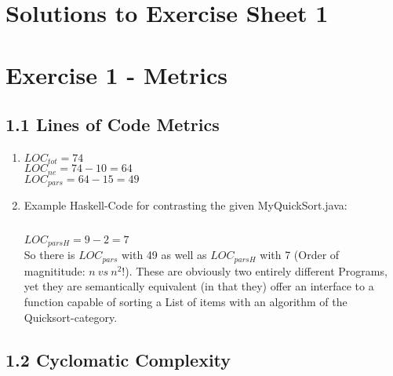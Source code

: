 \documentclass{scrartcl}
\begin{document}
\section*{Solutions to Exercise Sheet 1}

\section*{Exercise 1 - Metrics}

\subsection*{1.1 Lines of Code Metrics}

\begin{enumerate}[i]
    \item $LOC_{tot} = 74 $\\
          $ LOC_{ne} = 74 - 10 = 64 $\\
          $ LOC_{pars} = 64 - 15 = 49 $\\
    \item Example Haskell-Code for contrasting the given MyQuickSort.java: \\
        \inputminted[linenos]{Haskell}{MyQuickSort.hs}


        $LOC_{parsH} = 9 - 2 = 7$ \\
        So there is $LOC_{pars}$ with 49 as well as $LOC_{parsH}$ with 7 (Order of magnititude: $n\ vs\ n^2$!).
        These are obviously two entirely different Programs, yet they are semantically equivalent (in that they)
        offer an interface to a function capable of sorting a List of items with an algorithm of the Quicksort-category.
\end{enumerate}



\subsection*{1.2 Cyclomatic Complexity}
\end{document}
